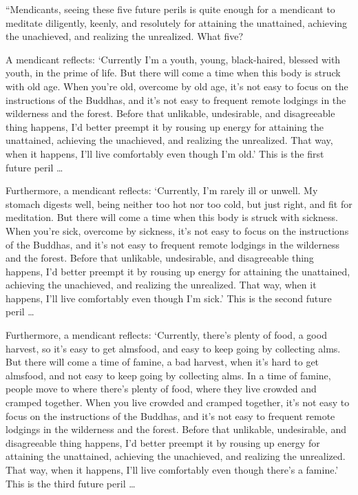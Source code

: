 \documentclass[12pt,openany]{book}%
\begin{document}
“Mendicants, seeing these five future perils is quite enough for a mendicant to meditate diligently, keenly, and resolutely for attaining the unattained, achieving the unachieved, and realizing the unrealized. What five? 

A mendicant reflects: ‘Currently I’m a youth, young, black-haired, blessed with youth, in the prime of life. But there will come a time when this body is struck with old age. When you’re old, overcome by old age, it’s not easy to focus on the instructions of the Buddhas, and it’s not easy to frequent remote lodgings in the wilderness and the forest. Before that unlikable, undesirable, and disagreeable thing happens, I’d better preempt it by rousing up energy for attaining the unattained, achieving the unachieved, and realizing the unrealized. That way, when it happens, I’ll live comfortably even though I’m old.’ This is the first future peril … 

Furthermore, a mendicant reflects: ‘Currently, I’m rarely ill or unwell. My stomach digests well, being neither too hot nor too cold, but just right, and fit for meditation. But there will come a time when this body is struck with sickness. When you’re sick, overcome by sickness, it’s not easy to focus on the instructions of the Buddhas, and it’s not easy to frequent remote lodgings in the wilderness and the forest. Before that unlikable, undesirable, and disagreeable thing happens, I’d better preempt it by rousing up energy for attaining the unattained, achieving the unachieved, and realizing the unrealized. That way, when it happens, I’ll live comfortably even though I’m sick.’ This is the second future peril … 

Furthermore, a mendicant reflects: ‘Currently, there’s plenty of food, a good harvest, so it’s easy to get almsfood, and easy to keep going by collecting alms. But there will come a time of famine, a bad harvest, when it’s hard to get almsfood, and not easy to keep going by collecting alms. In a time of famine, people move to where there’s plenty of food, where they live crowded and cramped together. When you live crowded and cramped together, it’s not easy to focus on the instructions of the Buddhas, and it’s not easy to frequent remote lodgings in the wilderness and the forest. Before that unlikable, undesirable, and disagreeable thing happens, I’d better preempt it by rousing up energy for attaining the unattained, achieving the unachieved, and realizing the unrealized. That way, when it happens, I’ll live comfortably even though there’s a famine.’ This is the third future peril … 
\end{document}
